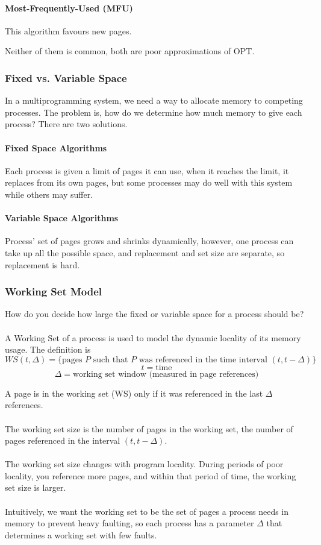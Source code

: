 \documentclass{article}
\begin{document}
\paragraph{Most-Frequently-Used (MFU)} This algorithm favours new pages.

Neither of them is common, both are poor approximations of OPT.

\subsubsection{Fixed vs. Variable Space}

In a multiprogramming system, we need a way to allocate memory to competing processes. The problem is, how do we determine how much memory to give each process? There are two solutions.

\paragraph{Fixed Space Algorithms} Each process is given a limit of pages it can use, when it reaches the limit, it replaces from its own pages, but some processes may do well with this system while others may suffer.

\paragraph{Variable Space Algorithms} Process' set of pages grows and shrinks dynamically, however, one process can take up all the possible space, and replacement and set size are separate, so replacement is hard.

\subsubsection{Working Set Model}

How do you decide how large the fixed or variable space for a process should be?\\
\\
A Working Set of a process is used to model the dynamic locality of its memory usage. The definition is
$$WS(t,\Delta) = \{ \text{pages $P$ such that $P$ was referenced in the time interval $(t, t-\Delta)$} \}$$
$$t=\text{time}$$
$$\Delta = \text{working set window (measured in page references)}$$

A page is in the working set (WS) only if it was referenced in the last $\Delta$ references.\\
\\
The working set size is the number of pages in the working set, the number of pages referenced in the interval $(t,t-\Delta)$.\\
\\
The working set size changes with program locality. During periods of poor locality, you reference more pages, and within that period of time, the working set size is larger.\\
\\
Intuitively, we want the working set to be the set of pages a process needs in memory to prevent heavy faulting, so each process has a parameter $\Delta$ that determines a working set with few faults.
\end{document}
